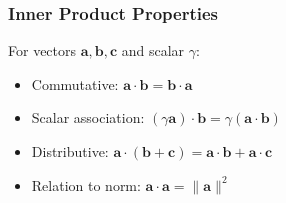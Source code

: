 \documentclass{book}
\begin{document}
\subsubsection{Inner Product Properties}
For vectors $\bm{a}, \bm{b}, \bm{c}$ and scalar $\gamma$:
\begin{itemize}
    \item Commutative: $\bm{a} \cdot \bm{b} = \bm{b} \cdot \bm{a}$
    \item Scalar association: $(\gamma\bm{a}) \cdot \bm{b} = \gamma(\bm{a} \cdot \bm{b})$
    \item Distributive: $\bm{a} \cdot (\bm{b} + \bm{c}) = \bm{a} \cdot \bm{b} + \bm{a} \cdot \bm{c}$
    \item Relation to norm: $\bm{a} \cdot \bm{a} = \|\bm{a}\|^2$
\end{itemize}
\end{document}
